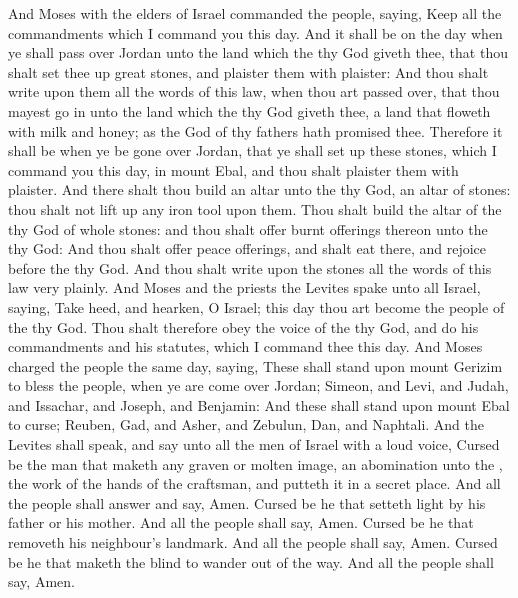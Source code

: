 \begin{biblechapter} %
 And Moses with the elders of Israel commanded the people, saying, Keep all the commandments which I command you this day.
\verse And it shall be on the day when ye shall pass over Jordan unto the land which the \LORD thy God giveth thee, that thou shalt set thee up great stones, and plaister them with plaister:
\verse And thou shalt write upon them all the words of this law, when thou art passed over, that thou mayest go in unto the land which the \LORD thy God giveth thee, a land that floweth with milk and honey; as the \LORD God of thy fathers hath promised thee.
\verse Therefore it shall be when ye be gone over Jordan, that ye shall set up these stones, which I command you this day, in mount Ebal, and thou shalt plaister them with plaister.
\verse And there shalt thou build an altar unto the \LORD thy God, an altar of stones: thou shalt not lift up any iron tool upon them.
\verse Thou shalt build the altar of the \LORD thy God of whole stones: and thou shalt offer burnt offerings thereon unto the \LORD thy God:
\verse And thou shalt offer peace offerings, and shalt eat there, and rejoice before the \LORD thy God.
\verse And thou shalt write upon the stones all the words of this law very plainly.
 And Moses and the priests the Levites spake unto all Israel, saying, Take heed, and hearken, O Israel; this day thou art become the people of the \LORD thy God.
\verse Thou shalt therefore obey the voice of the \LORD thy God, and do his commandments and his statutes, which I command thee this day.
\verse And Moses charged the people the same day, saying,
\verse These shall stand upon mount Gerizim to bless the people, when ye are come over Jordan; Simeon, and Levi, and Judah, and Issachar, and Joseph, and Benjamin:
\verse And these shall stand upon mount Ebal to curse; Reuben, Gad, and Asher, and Zebulun, Dan, and Naphtali.
\verse And the Levites shall speak, and say unto all the men of Israel with a loud voice,
\verse Cursed be the man that maketh any graven or molten image, an abomination unto the \LORD, the work of the hands of the craftsman, and putteth it in a secret place. And all the people shall answer and say, Amen.
\verse Cursed be he that setteth light by his father or his mother. And all the people shall say, Amen.
\verse Cursed be he that removeth his neighbour's landmark. And all the people shall say, Amen.
\verse Cursed be he that maketh the blind to wander out of the way. And all the people shall say, Amen.

\end{biblechapter}
